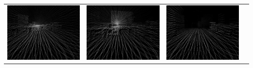 \documentclass[english, bachelor, utf8]{base/thesis_telematics}
\begin{document}
\begin{table}[h]
\begin{tabular}{
  >{\centering\arraybackslash}m{}
  >{\centering\arraybackslash}m{}
  >{\centering\arraybackslash}m{}
  >{\centering\arraybackslash}m{}
}
    \includegraphics[width=\linewidth]{pics/robo/robo_2/depth0016_aligned.png} &
    \includegraphics[width=\linewidth]{pics/robo/robo_3/depth0016_aligned.png} &
    \includegraphics[width=\linewidth]{pics/robo/robo_4/depth0016_aligned.png} \\

\end{tabular}
\end{table}
\end{document}
